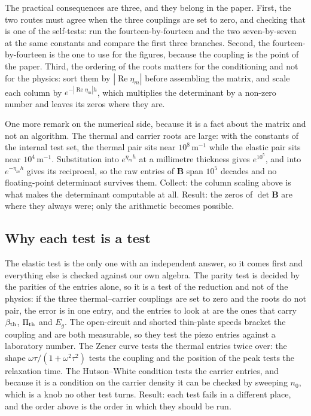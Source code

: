\documentclass[11pt]{article}
\makeatletter
\newif\ifshowworked
\newenvironment{worked}{%
  \ifshowworked\par\smallskip\noindent\textit{Working.}\par\smallskip\else
  \setbox\z@\vbox\bgroup\fi}{\ifshowworked\par\smallskip\else\egroup\fi}
\makeatother
\begin{document}
The practical consequences are three, and they belong in the paper. First, the two routes must agree when
the three couplings are set to zero, and checking that is one of the self-tests: run the fourteen-by-fourteen
and the two seven-by-seven at the same constants and compare the first three branches. Second, the
fourteen-by-fourteen is the one to use for the figures, because the coupling is the point of the paper.
Third, the ordering of the roots matters for the conditioning and not for the physics: sort them by
$|\operatorname{Re}\eta_m|$ before assembling the matrix, and scale each column by
$e^{-|\operatorname{Re}\eta_m|h}$, which multiplies the determinant by a non-zero number and leaves its
zeros where they are.

\begin{worked}
One more remark on the numerical side, because it is a fact about the matrix and not an algorithm. The
thermal and carrier roots are large: with the constants of the internal test set, the thermal pair sits
near $10^{8}$\,m$^{-1}$ while the elastic pair sits near $10^{4}$\,m$^{-1}$. Substitution into
$e^{\eta_mh}$ at a millimetre thickness gives $e^{10^{5}}$, and into $e^{-\eta_mh}$ gives its reciprocal,
so the raw entries of $\mathbf B$ span $10^{5}$ decades and no floating-point determinant survives them.
Collect: the column scaling above is what makes the determinant computable at all. Result: the zeros of
$\det\mathbf B$ are where they always were; only the arithmetic becomes possible.
\end{worked}

\subsection*{Why each test is a test}

\begin{worked}
The elastic test is the only one with an independent answer, so it comes first and everything else is
checked against our own algebra. The parity test is decided by the parities of the entries alone, so it is
a test of the reduction and not of the physics: if the three thermal--carrier couplings are set to zero and
the roots do not pair, the error is in one entry, and the entries to look at are the ones that carry
$\beta_{\rm th}$, $\Pi_{\rm th}$ and $E_g$. The open-circuit and shorted thin-plate speeds bracket the
coupling and are both measurable, so they test the piezo entries against a laboratory number. The Zener
curve tests the thermal entries twice over: the shape $\omega\tau/(1+\omega^2\tau^2)$ tests the coupling
and the position of the peak tests the relaxation time. The Hutson--White condition tests the carrier
entries, and because it is a condition on the carrier density it can be checked by sweeping $n_0$, which is
a knob no other test turns.
Result: each test fails in a different place, and the order above is the order in which they should be run.
\end{worked}
\end{document}

